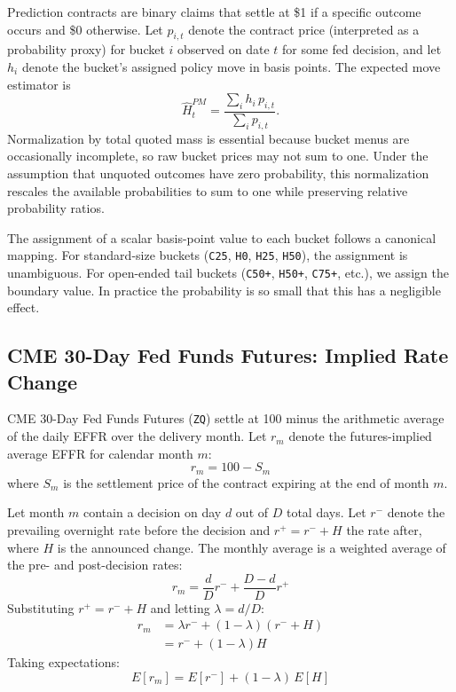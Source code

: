 Prediction contracts are binary claims that settle at \$1 if a specific outcome occurs and \$0 otherwise. Let $p_{i,t}$ denote the contract price (interpreted as a probability proxy) for bucket $i$ observed on date $t$ for some fed decision, and let $h_i$ denote the bucket's assigned policy move in basis points. The expected move estimator is
\[
\widehat{H}^{PM}_{t}=\frac{\sum_i h_i\,p_{i,t}}{\sum_i p_{i,t}}.
\]
Normalization by total quoted mass is essential because bucket menus are occasionally incomplete, so raw bucket prices may not sum to one. Under the assumption that unquoted outcomes have zero probability, this normalization rescales the available probabilities to sum to one while preserving relative probability ratios.

The assignment of a scalar basis-point value to each bucket follows a canonical mapping. For standard-size buckets (\texttt{C25}, \texttt{H0}, \texttt{H25}, \texttt{H50}), the assignment is unambiguous. For open-ended tail buckets (\texttt{C50+}, \texttt{H50+}, \texttt{C75+}, etc.), we assign the boundary value. In practice the probability is so small that this has a negligible effect.

\subsection{CME 30-Day Fed Funds Futures: Implied Rate Change}

CME 30-Day Fed Funds Futures (\texttt{ZQ}) settle at 100 minus the 
arithmetic average of the daily EFFR over the delivery month. Let 
$r_m$ denote the futures-implied average EFFR for calendar month 
$m$:
\begin{equation}
  r_m = 100 - S_m
\end{equation}
where $S_m$ is the settlement price of the contract expiring at 
the end of month $m$.

Let month $m$ contain a decision on day $d$ out of $D$ total days. 
Let $r^-$ denote the prevailing overnight rate before the decision 
and $r^+ = r^- + H$ the rate after, where $H$ is the announced 
change. The monthly average is a weighted average of the pre- and 
post-decision rates:
\begin{equation}
    r_m = \frac{d}{D} r^- + \frac{D-d}{D} r^+
\end{equation}
Substituting $r^+ = r^- + H$ and letting $\lambda = d/D$:
\begin{align}
    r_m &= \lambda r^- + (1-\lambda)(r^- + H) \\
        &= r^- + (1-\lambda)H
\end{align}
Taking expectations:
\begin{equation}
    E[r_m] = E[r^-] + (1-\lambda)\, E[H]
    \label{eq:decomp}
\end{equation}

